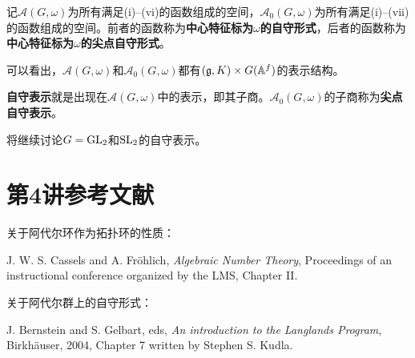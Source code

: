 记$\mathcal A(G,\omega)$为所有满足(i)--(vi)的函数组成的空间，$\mathcal A_0(G,\omega)$为所有满足(i)--(vii)的函数组成的空间。前者的函数称为\textbf{中心特征标为$\omega$的自守形式}，后者的函数称为\textbf{中心特征标为$\omega$的尖点自守形式}。

可以看出，$\mathcal A(G,\omega)$和$\mathcal A_0(G,\omega)$都有$(\mathfrak{g},K)\times G(\mathbb{A}^f)$的表示结构。

\textbf{自守表示}就是出现在$\mathcal A(G,\omega)$中的表示，即其子商。$\mathcal A_0(G,\omega)$的子商称为\textbf{尖点自守表示}。

将继续讨论$G=\operatorname{GL}_2$和$\operatorname{SL}_2$的自守表示。
\section{第4讲参考文献}\label{L4S4}
关于阿代尔环作为拓扑环的性质：
\begin{references} J. W. S. Cassels and A. Fr\"ohlich, \textit{Algebraic Number Theory}, Proceedings of an instructional conference organized by the LMS, Chapter II.\end{references}
关于阿代尔群上的自守形式：
\begin{references} J. Bernstein and S. Gelbart, eds, \textit{An introduction to the Langlands Program}, Birkh\"auser, 2004, Chapter 7 written by Stephen S. Kudla.\end{references}
